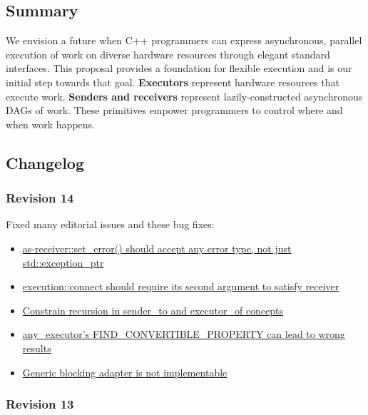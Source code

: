 \documentclass[a4paper,12pt,notitlepage,twoside,openright]{article}
\begin{document}
\hypertarget{summary}{%
\subsection{Summary}\label{summary}}

We envision a future when C++ programmers can express asynchronous,
parallel execution of work on diverse hardware resources through elegant
standard interfaces. This proposal provides a foundation for flexible
execution and is our initial step towards that goal. \textbf{Executors}
represent hardware resources that execute work. \textbf{Senders and
receivers} represent lazily-constructed asynchronous DAGs of work. These
primitives empower programmers to control where and when work happens.

\hypertarget{changelog}{%
\subsection{Changelog}\label{changelog}}

\hypertarget{revision-14}{%
\subsubsection{Revision 14}\label{revision-14}}

Fixed many editorial issues and these bug fixes:

\begin{itemize}

\item
  \href{https://github.com/executors/executors/issues/462}{as-receiver::set\_error()
  should accept any error type, not just std::exception\_ptr}
\item
  \href{https://github.com/executors/executors/issues/473}{execution::connect
  should require its second argument to satisfy receiver}
\item
  \href{https://github.com/executors/executors/issues/474}{Constrain
  recursion in sender\_to and executor\_of concepts}
\item
  \href{https://github.com/executors/executors/issues/508}{any\_executor's
  FIND\_CONVERTIBLE\_PROPERTY can lead to wrong results}
\item
  \href{https://github.com/executors/executors/issues/512}{Generic
  blocking adapter is not implementable}
\end{itemize}

\hypertarget{revision-13}{%
\subsubsection{Revision 13}\label{revision-13}}
\end{document}

